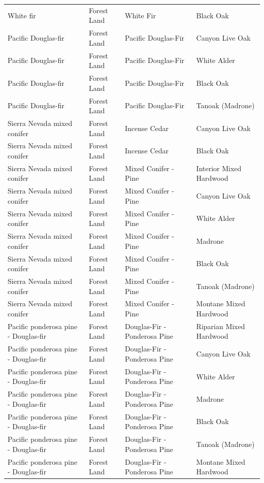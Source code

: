 \documentclass{article}
\begin{document}
\begin{tabular}{llll}
White fir	&	Forest Land	&	White Fir	&	Black Oak	\\
Pacific Douglas-fir	&	Forest Land	&	Pacific Douglas-Fir	&	Canyon Live Oak	\\
Pacific Douglas-fir	&	Forest Land	&	Pacific Douglas-Fir	&	White Alder	\\
Pacific Douglas-fir	&	Forest Land	&	Pacific Douglas-Fir	&	Black Oak	\\
Pacific Douglas-fir	&	Forest Land	&	Pacific Douglas-Fir	&	Tanoak (Madrone)	\\
Sierra Nevada mixed conifer	&	Forest Land	&	Incense Cedar	&	Canyon Live Oak	\\
Sierra Nevada mixed conifer	&	Forest Land	&	Incense Cedar	&	Black Oak	\\
Sierra Nevada mixed conifer	&	Forest Land	&	Mixed Conifer - Pine	&	Interior Mixed Hardwood	\\
Sierra Nevada mixed conifer	&	Forest Land	&	Mixed Conifer - Pine	&	Canyon Live Oak	\\
Sierra Nevada mixed conifer	&	Forest Land	&	Mixed Conifer - Pine	&	White Alder	\\
Sierra Nevada mixed conifer	&	Forest Land	&	Mixed Conifer - Pine	&	Madrone	\\
Sierra Nevada mixed conifer	&	Forest Land	&	Mixed Conifer - Pine	&	Black Oak	\\
Sierra Nevada mixed conifer	&	Forest Land	&	Mixed Conifer - Pine	&	Tanoak (Madrone)	\\
Sierra Nevada mixed conifer	&	Forest Land	&	Mixed Conifer - Pine	&	Montane Mixed Hardwood	\\
Pacific ponderosa pine - Douglas-fir	&	Forest Land	&	Douglas-Fir - Ponderosa Pine	&	Riparian Mixed Hardwood	\\
Pacific ponderosa pine - Douglas-fir	&	Forest Land	&	Douglas-Fir - Ponderosa Pine	&	Canyon Live Oak	\\
Pacific ponderosa pine - Douglas-fir	&	Forest Land	&	Douglas-Fir - Ponderosa Pine	&	White Alder	\\
Pacific ponderosa pine - Douglas-fir	&	Forest Land	&	Douglas-Fir - Ponderosa Pine	&	Madrone	\\
Pacific ponderosa pine - Douglas-fir	&	Forest Land	&	Douglas-Fir - Ponderosa Pine	&	Black Oak	\\
Pacific ponderosa pine - Douglas-fir	&	Forest Land	&	Douglas-Fir - Ponderosa Pine	&	Tanoak (Madrone)	\\
Pacific ponderosa pine - Douglas-fir	&	Forest Land	&	Douglas-Fir - Ponderosa Pine	&	Montane Mixed Hardwood	\\

\end{tabular}
\end{document}
